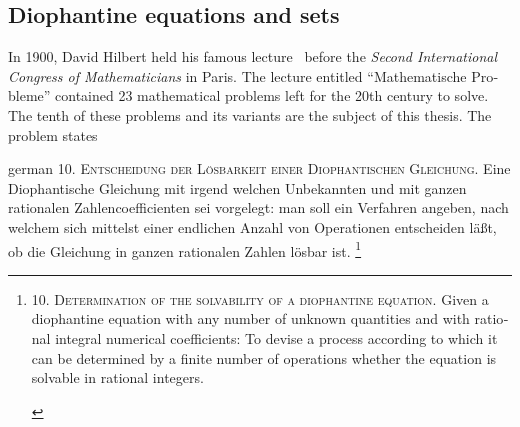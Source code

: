 %

\subsection{Diophantine equations and sets}

In 1900, David Hilbert held his famous lecture~\cite{Hilbert1900} before the
\emph{Second International Congress of Mathematicians} in Paris. The lecture
entitled \foreignquote{german}{Mathematische Probleme} contained 23
mathematical problems left for the 20th century to solve. The tenth of these
problems and its variants are the subject of this thesis. The problem states

\begin{foreigndisplayquote}{german}
  \textsc{10. Entscheidung der Lösbarkeit einer Diophantischen Gleichung.}
  Eine Diophantische Gleichung mit irgend welchen Unbekannten und mit
  ganzen rationalen Zahlencoefficienten sei vorgelegt: man soll ein Verfahren
  angeben, nach welchem sich mittelst einer endlichen Anzahl von Operationen
  entscheiden läßt, ob die Gleichung in ganzen rationalen Zahlen lösbar ist.%
  \footnote{
    \begin{english}
      \textsc{10. Determination of the solvability of a diophantine equation.}
      Given a diophantine equation with any number of unknown quantities and
      with rational integral numerical coefficients: To devise a process
      according to which it can be determined by a finite number of operations
      whether the equation is solvable in rational integers.
      \hspace*{\fill}\cite[translation published in][]{Hilbert2000}
    \end{english}
  }
  \hspace*{\fill}\cite{Hilbert1900}
\end{foreigndisplayquote}

